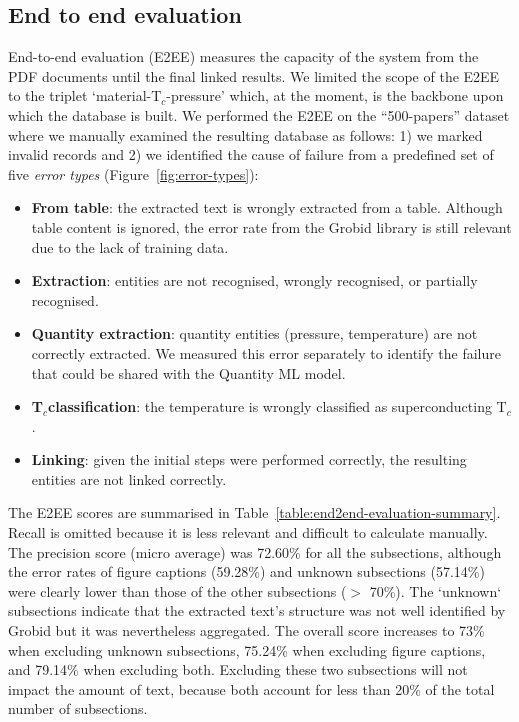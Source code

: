 \documentclass[]{interact}
\theoremstyle{plain}%
\theoremstyle{definition}
\theoremstyle{remark}
\newcommand{\tc}{T$_{c}$}
\begin{document}
\subsection{End to end evaluation}

End-to-end evaluation (E2EE) measures the capacity of the system from the PDF documents until the final linked results.
We limited the scope of the E2EE to the triplet `material-\tc-pressure' which, at the moment, is the backbone upon which the database is built.
We performed the E2EE on the ``500-papers'' dataset where we manually examined the resulting database as follows: 1) we marked invalid records and 2) we identified the cause of failure from a predefined set of five \textit{error types} (Figure~\ref{fig:error-types}):
\begin{itemize}
    \item \textbf{From table}: the extracted text is wrongly extracted from a table. Although table content is ignored, the error rate from the Grobid library is still relevant due to the lack of training data.
    \item \textbf{Extraction}: entities are not recognised, wrongly recognised, or partially recognised.
    \item \textbf{Quantity extraction}: quantity entities (pressure, temperature) are not correctly extracted. We measured this error separately to identify the failure that could be shared with the Quantity ML model.
    \item \textbf{\tc classification}: the temperature is wrongly classified as superconducting \tc.
    \item \textbf{Linking}: given the initial steps were performed correctly, the resulting entities are not linked correctly.
\end{itemize}

The E2EE scores are summarised in Table~\ref{table:end2end-evaluation-summary}.
Recall is omitted because it is less relevant and difficult to calculate manually.
The precision score (micro average) was 72.60\% for all the subsections, although the error rates of figure captions (59.28\%) and unknown subsections (57.14\%) were clearly lower than those of the other subsections ($>$ 70\%).
The `unknown` subsections indicate that the extracted text's structure was not well identified by Grobid but it was nevertheless aggregated.
The overall score increases to 73\% when excluding unknown subsections, 75.24\% when excluding figure captions, and 79.14\%  when excluding both.
Excluding these two subsections will not impact the amount of text, because both account for less than 20\% of the total number of subsections.
\end{document}
